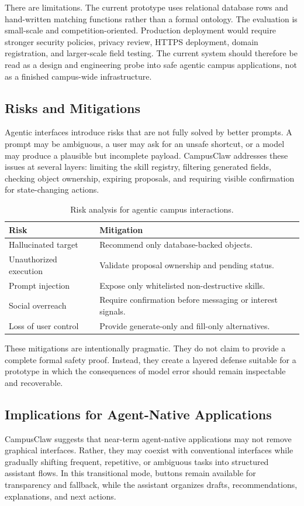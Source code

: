 \documentclass[sigconf]{acmart}
\begin{document}
There are limitations. The current prototype uses relational database rows and hand-written matching functions rather than a formal ontology. The evaluation is small-scale and competition-oriented. Production deployment would require stronger security policies, privacy review, HTTPS deployment, domain registration, and larger-scale field testing. The current system should therefore be read as a design and engineering probe into safe agentic campus applications, not as a finished campus-wide infrastructure.

\subsection{Risks and Mitigations}
Agentic interfaces introduce risks that are not fully solved by better prompts. A prompt may be ambiguous, a user may ask for an unsafe shortcut, or a model may produce a plausible but incomplete payload. CampusClaw addresses these issues at several layers: limiting the skill registry, filtering generated fields, checking object ownership, expiring proposals, and requiring visible confirmation for state-changing actions.

\begin{table}[t]
\centering
\caption{Risk analysis for agentic campus interactions.}
\label{tab:risks}
\begin{tabularx}{\linewidth}{lX}
\toprule
\textbf{Risk} & \textbf{Mitigation}\\
\midrule
Hallucinated target & Recommend only database-backed objects.\\
Unauthorized execution & Validate proposal ownership and pending status.\\
Prompt injection & Expose only whitelisted non-destructive skills.\\
Social overreach & Require confirmation before messaging or interest signals.\\
Loss of user control & Provide generate-only and fill-only alternatives.\\
\bottomrule
\end{tabularx}
\end{table}

These mitigations are intentionally pragmatic. They do not claim to provide a complete formal safety proof. Instead, they create a layered defense suitable for a prototype in which the consequences of model error should remain inspectable and recoverable.

\subsection{Implications for Agent-Native Applications}
CampusClaw suggests that near-term agent-native applications may not remove graphical interfaces. Rather, they may coexist with conventional interfaces while gradually shifting frequent, repetitive, or ambiguous tasks into structured assistant flows. In this transitional mode, buttons remain available for transparency and fallback, while the assistant organizes drafts, recommendations, explanations, and next actions.
\end{document}
